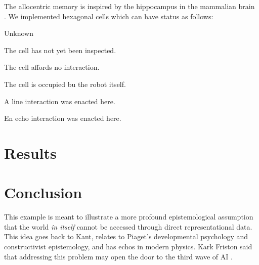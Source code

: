 \documentclass[pmlr]{jmlr}%
\begin{document}
The allocentric memory is inspired by the hippocampus in the mammalian brain \citep{grieves_representation_2017}.
We implemented hexagonal cells which can have status as follows: 

\begin{altdescription}{Unknown}
	\item[Unknown] The cell has not yet been inspected.
	\item[Free] The cell affords no interaction.
	\item[occupied] The cell is occupied bu the robot itself.
	\item[Line] A line interaction was enacted here.
	\item[Echo] En echo interaction was enacted here.
\end{altdescription}

\section{Results}

\section{Conclusion}

This example is meant to illustrate a more profound epistemological assumption that the world \textit{in itself} cannot be accessed through direct representational data. This idea goes back to Kant, relates to Piaget's developmental psychology and constructivist epistemology, and has echos in modern physics. 
Kark Friston said that addressing this problem may open the door to the third wave of AI \cite[time code 22:66]{videoFriston}. 




\end{document}
